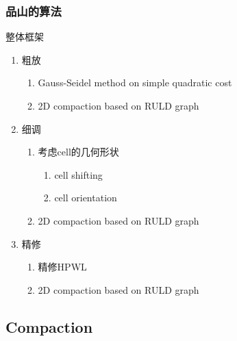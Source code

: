 \documentclass[UTF8,lualatex]{ctexbeamer}
\begin{document}
\begin{frame}
    \frametitle{品山的算法}
    
    \begin{block}{整体框架}
        \begin{enumerate}
            \item 粗放
                \begin{enumerate}
                    \item Gauss-Seidel method on simple quadratic cost
                    \item 2D compaction based on RULD graph
                \end{enumerate}
            \item 细调
                \begin{enumerate}
                    \item 考虑cell的几何形状
                        \begin{enumerate}
                            \item cell shifting
                            \item cell orientation
                        \end{enumerate}
                    \item 2D compaction based on RULD graph
                \end{enumerate}
            \item 精修
                \begin{enumerate}
                    \item 精修HPWL
                    \item 2D compaction based on RULD graph
                \end{enumerate}
        \end{enumerate}
    \end{block}
\end{frame}


\subsection{Compaction}
\end{document}
